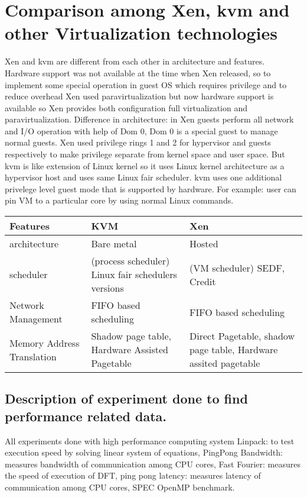 \documentclass[seminar,twoside]{iitbreport}
\begin{document}
\section{Comparison among Xen, kvm and other Virtualization technologies}
Xen and kvm are different from each other in architecture and features. Hardware support
was not available at the time when Xen released, so to implement some special operation in
guest OS which requires privilege and to reduce overhead Xen used paravirtualization but
now hardware support is available so Xen provides both configuration full virtualization
and paravirtualization. Difference in architecture: in Xen guests perform all network and
I/O operation with help of Dom 0, Dom 0 is a special guest to manage normal guests. 
Xen used privilege rings 1 and 2 for hypervisor and guests respectively to make privilege separate 
from kernel space and user space.
But kvm is like extension of Linux kernel so it uses Linux kernel architecture as a hypervisor
host and uses same Linux fair scheduler.
kvm uses one additional privelege level guest mode that is supported by hardware. 
For example: user can pin VM to a particular core by using normal Linux commands.
\label{tab-table}
\begin{tabularx}{\textwidth}{|X|X|X|}
\hline
 Features & KVM & Xen \\
\hline
architecture& Bare metal & Hosted \\
\hline
scheduler& (process scheduler) Linux fair schedulers versions& (VM scheduler) SEDF, Credit\\
\hline
Network Management& FIFO based scheduling& FIFO based scheduling\\
\hline
Memory Address Translation& Shadow page table, Hardware Assisted Pagetable&Direct Pagetable, shadow page table, Hardware assited pagetable\\
\hline
\end{tabularx}

\subsection{Description of experiment done to find performance related data.}
All experiments done with high performance computing system 
Linpack: to test execution speed by solving linear system of equations, PingPong Bandwidth: 
measures bandwidth of communication among CPU cores, Fast Fourier: measures the
speed of execution of DFT, ping pong latency: measures latency of communication among
CPU cores, SPEC OpenMP benchmark\cite{comparisonm}.
\end{document}
